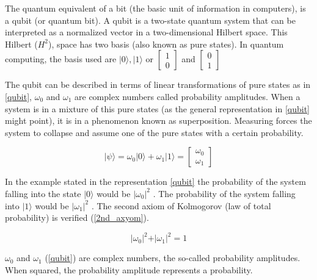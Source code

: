 The quantum equivalent of a bit (the basic unit of information in computers), is a qubit (or quantum bit). A qubit is a two-state quantum system that can be interpreted as a normalized vector in a two-dimensional Hilbert space. This Hilbert ($H^2$), space has two basis (also known as pure states). In quantum computing, the basis used are ${ \vert 0 \rangle , \vert 1 \rangle }$ or $\left[\begin{array}{c}
1\\
0
\end{array}\right]$
 and 
$\left[\begin{array}{c}
0\\
1
\end{array}\right]$ 

The qubit can be described in terms of linear transformations of pure states as in \ref{qubit}, $\omega_{0}$ and $\omega_{1}$ are complex numbers called probability amplitudes. When a system is in a mixture of this pure states (as the general representation in \ref{qubit} might point), it is in a phenomenon known as superposition. Measuring forces the system to collapse and assume one of the pure states with a certain probability. 

\begin{equation}
\label{qubit}
\vert \psi \rangle = \omega_{0}\vert0\rangle+\omega_{1}\vert1\rangle = \left[\begin{array}{c}
\omega_{0}\\
\omega_{1}
\end{array}\right]
\end{equation}

In the example stated in the representation \ref{qubit} the probability of the system falling into the state $\vert 0 \rangle $ would be $\vert\omega_{0}\vert^{2}$ . The probability of the system falling into $\vert 1 \rangle $ would be $\vert\omega_{1}\vert^{2}$ . The second axiom of Kolmogorov (law of total probability) is verified (\ref{2nd_axyom}).

\begin{equation}
\label{2nd_axyom}
\vert\omega_{0}\vert^{2}+\vert\omega_{1}\vert^{2}=1
\end{equation}

 
$\omega_{0}$ and $\omega_{1}$ (\ref{qubit}) are complex numbers, the so-called probability amplitudes. When squared, the probability amplitude represents a probability. 

